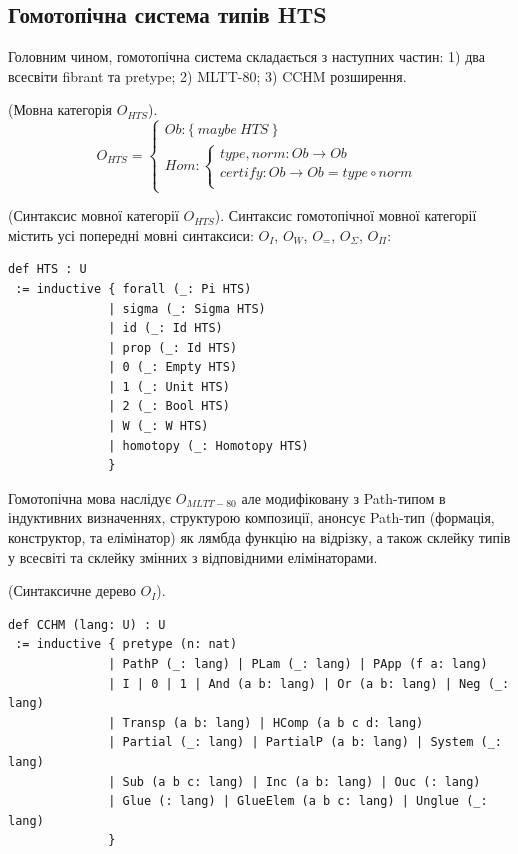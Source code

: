 \newpage
\subsection{Гомотопічна система типів HTS}

Головним чином, гомотопічна система складається з наступних частин:
1) два всесвіти fibrant та pretype; 2) MLTT-80; 3) CCHM розширення.

\begin{definition} (Мовна категорія $O_{HTS}$).
$$
O_{HTS} =
\begin{cases}
Ob: \{\ maybe\ HTS\ \} \\
Hom: \begin{cases}
type,norm: Ob \rightarrow Ob \\
certify: Ob \rightarrow Ob = type \circ norm \\
\end{cases}
\end{cases}
$$
\end{definition}

\begin{definition} (Синтаксис мовної категорії $O_{HTS}$).
Синтаксис гомотопічної мовної категорії містить усі
попередні мовні синтаксиси: $O_I$, $O_W$, $O_=$, $O_\Sigma$, $O_\Pi$:
\begin{lstlisting}
def HTS : U
 := inductive { forall (_: Pi HTS)
              | sigma (_: Sigma HTS)
              | id (_: Id HTS)
              | prop (_: Id HTS)
              | 0 (_: Empty HTS)
              | 1 (_: Unit HTS)
              | 2 (_: Bool HTS)
              | W (_: W HTS)
              | homotopy (_: Homotopy HTS)
              }
\end{lstlisting}
\end{definition}

Гомотопічна мова наслідує $O_{MLTT-80}$ але модифіковану з
Path-типом в індуктивних визначеннях, структурою композиції,
анонсує Path-тип (формація, конструктор, та елімінатор)
як лямбда функцію на відрізку, а також склейку типів у всесвіті
та склейку змінних з відповідними елімінаторами.

\begin{definition} (Синтаксичне дерево $O_I$).
\begin{lstlisting}
def CCHM (lang: U) : U
 := inductive { pretype (n: nat)
              | PathP (_: lang) | PLam (_: lang) | PApp (f a: lang)
              | I | 0 | 1 | And (a b: lang) | Or (a b: lang) | Neg (_: lang)
              | Transp (a b: lang) | HComp (a b c d: lang)
              | Partial (_: lang) | PartialP (a b: lang) | System (_: lang)
              | Sub (a b c: lang) | Inc (a b: lang) | Ouc (: lang)
              | Glue (: lang) | GlueElem (a b c: lang) | Unglue (_: lang)
              }
\end{lstlisting}
\end{definition}

